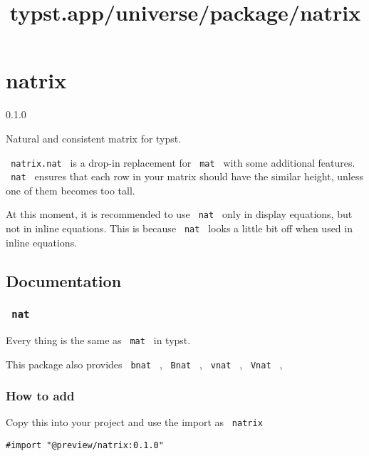 \title{typst.app/universe/package/natrix}

\label{banner}
\section{natrix}\label{natrix}

{ 0.1.0 }

Natural and consistent matrix for typst.

\label{readme}
\pandocbounded{}

\texttt{\ natrix.nat\ } is a drop-in replacement for \texttt{\ mat\ }
with some additional features. \texttt{\ nat\ } ensures that each row in
your matrix should have the similar height, unless one of them becomes
too tall.

At this moment, it is recommended to use \texttt{\ nat\ } only in
display equations, but not in inline equations. This is because
\texttt{\ nat\ } looks a little bit off when used in inline equations.

\subsection{Documentation}\label{documentation}

\subsubsection{\texorpdfstring{\texttt{\ nat\ }}{ nat }}\label{nat}

Every thing is the same as \texttt{\ mat\ } in typst.

This package also provides \texttt{\ bnat\ } , \texttt{\ Bnat\ } ,
\texttt{\ vnat\ } , \texttt{\ Vnat\ } ,

\subsubsection{How to add}\label{how-to-add}

Copy this into your project and use the import as \texttt{\ natrix\ }

\begin{verbatim}
#import "@preview/natrix:0.1.0"
\end{verbatim}



